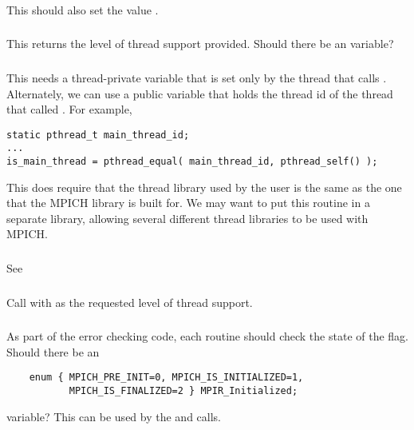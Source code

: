 \documentclass{article}
\begin{document}
\subsubsection{}
\begin{adi3}
\end{adi3}
This should also set the value .

\subsubsection{}
This returns the level of thread support provided.  Should there be an
 variable?

\subsubsection{}
This needs a thread-private variable that is set only by the thread that calls
.  Alternately, we can use a public variable that
holds the thread id of the thread that called .  For
example, 
\begin{verbatim}
static pthread_t main_thread_id;
...
is_main_thread = pthread_equal( main_thread_id, pthread_self() );
\end{verbatim}
This does require that the thread library used by the user is the same as the
one that the MPICH library is built for.  We may want to put this routine in a
separate library, allowing several different thread libraries to be used with
MPICH. 

\subsubsection{}
See 

\subsubsection{}
Call  with  as the
requested level of thread support.

\subsubsection{}
As part of the error checking code, each routine should check the
state of the  flag.  Should there be an 
\begin{verbatim}
    enum { MPICH_PRE_INIT=0, MPICH_IS_INITIALIZED=1,
           MPICH_IS_FINALIZED=2 } MPIR_Initialized;
\end{verbatim}
variable?  This can be used by the  and
 calls.
\end{document}
